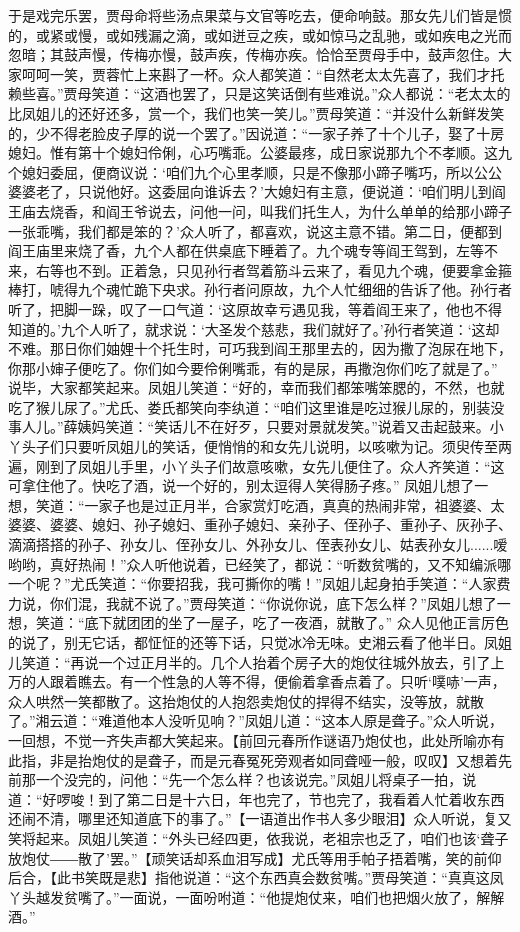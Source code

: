 \documentclass[12pt,oneside]{book}
\begin{document}
于是戏完乐罢，贾母命将些汤点果菜与文官等吃去，便命响鼓。那女先儿们皆是惯的，或紧或慢，或如残漏之滴，或如迸豆之疾，或如惊马之乱驰，或如疾电之光而忽暗；其鼓声慢，传梅亦慢，鼓声疾，传梅亦疾。恰恰至贾母手中，鼓声忽住。大家呵呵一笑，贾蓉忙上来斟了一杯。众人都笑道：“自然老太太先喜了，我们才托赖些喜。”贾母笑道：“这酒也罢了，只是这笑话倒有些难说。”众人都说：“老太太的比凤姐儿的还好还多，赏一个，我们也笑一笑儿。”贾母笑道：“并没什么新鲜发笑的，少不得老脸皮子厚的说一个罢了。”因说道：“一家子养了十个儿子，娶了十房媳妇。惟有第十个媳妇伶俐，心巧嘴乖。公婆最疼，成日家说那九个不孝顺。这九个媳妇委屈，便商议说：‘咱们九个心里孝顺，只是不像那小蹄子嘴巧，所以公公婆婆老了，只说他好。这委屈向谁诉去？’大媳妇有主意，便说道：‘咱们明儿到阎王庙去烧香，和阎王爷说去，问他一问，叫我们托生人，为什么单单的给那小蹄子一张乖嘴，我们都是笨的？’众人听了，都喜欢，说这主意不错。第二日，便都到阎王庙里来烧了香，九个人都在供桌底下睡着了。九个魂专等阎王驾到，左等不来，右等也不到。正着急，只见孙行者驾着筋斗云来了，看见九个魂，便要拿金箍棒打，唬得九个魂忙跪下央求。孙行者问原故，九个人忙细细的告诉了他。孙行者听了，把脚一跺，叹了一口气道：‘这原故幸亏遇见我，等着阎王来了，他也不得知道的。’九个人听了，就求说：‘大圣发个慈悲，我们就好了。’孙行者笑道：‘这却不难。那日你们妯娌十个托生时，可巧我到阎王那里去的，因为撒了泡尿在地下，你那小婶子便吃了。你们如今要伶俐嘴乖，有的是尿，再撒泡你们吃了就是了。”
说毕，大家都笑起来。凤姐儿笑道：“好的，幸而我们都笨嘴笨腮的，不然，也就吃了猴儿尿了。”尤氏、娄氏都笑向李纨道：“咱们这里谁是吃过猴儿尿的，别装没事人儿。”薛姨妈笑道：“笑话儿不在好歹，只要对景就发笑。”说着又击起鼓来。小丫头子们只要听凤姐儿的笑话，便悄悄的和女先儿说明，以咳嗽为记。须臾传至两遍，刚到了凤姐儿手里，小丫头子们故意咳嗽，女先儿便住了。众人齐笑道：“这可拿住他了。快吃了酒，说一个好的，别太逗得人笑得肠子疼。”
凤姐儿想了一想，笑道：“一家子也是过正月半，合家赏灯吃酒，真真的热闹非常，祖婆婆、太婆婆、婆婆、媳妇、孙子媳妇、重孙子媳妇、亲孙子、侄孙子、重孙子、灰孙子、滴滴搭搭的孙子、孙女儿、侄孙女儿、外孙女儿、侄表孙女儿、姑表孙女儿......嗳哟哟，真好热闹！”众人听他说着，已经笑了，都说：“听数贫嘴的，又不知编派哪一个呢？”尤氏笑道：“你要招我，我可撕你的嘴！”凤姐儿起身拍手笑道：“人家费力说，你们混，我就不说了。”贾母笑道：“你说你说，底下怎么样？”凤姐儿想了一想，笑道：“底下就团团的坐了一屋子，吃了一夜酒，就散了。”
众人见他正言厉色的说了，别无它话，都怔怔的还等下话，只觉冰冷无味。史湘云看了他半日。凤姐儿笑道：“再说一个过正月半的。几个人抬着个房子大的炮仗往城外放去，引了上万的人跟着瞧去。有一个性急的人等不得，便偷着拿香点着了。只听‘噗哧’一声，众人哄然一笑都散了。这抬炮仗的人抱怨卖炮仗的捍得不结实，没等放，就散了。”湘云道：“难道他本人没听见响？”凤姐儿道：“这本人原是聋子。”众人听说，一回想，不觉一齐失声都大笑起来。【前回元春所作谜语乃炮仗也，此处所喻亦有此指，非是抬炮仗的是聋子，而是元春冤死旁观者如同聋哑一般，叹叹】又想着先前那一个没完的，问他：“先一个怎么样？也该说完。”凤姐儿将桌子一拍，说道：“好啰唆！到了第二日是十六日，年也完了，节也完了，我看着人忙着收东西还闹不清，哪里还知道底下的事了。”【一语道出作书人多少眼泪】众人听说，复又笑将起来。凤姐儿笑道：“外头已经四更，依我说，老祖宗也乏了，咱们也该‘聋子放炮仗――散了’罢。”【顽笑话却系血泪写成】尤氏等用手帕子捂着嘴，笑的前仰后合，【此书笑既是悲】指他说道：“这个东西真会数贫嘴。”贾母笑道：“真真这凤丫头越发贫嘴了。”一面说，一面吩咐道：“他提炮仗来，咱们也把烟火放了，解解酒。”
\end{document}
